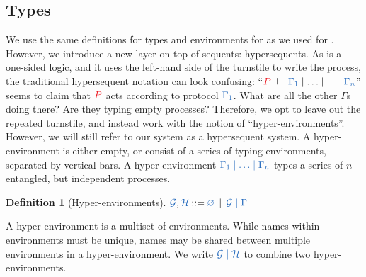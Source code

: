 \documentclass[submission,copyright,creativecommons]{eptcs}
\def\Coloneqq{\mathbin{::=}}
\newtheorem{definition}[lemma]{Definition}
\begin{document}
\subsection{Types}\label{sec:hcp-types}
We use the same definitions for types and environments for \hcp as we used for \cp. However, we introduce a new layer on top of sequents: hypersequents. As \cp is a one-sided logic, and it uses the left-hand side of the turnstile to write the process, the traditional hypersequent notation can look confusing: ``$\seq[P]{\Gamma_1}\hsep\dots\hsep\seq{\Gamma_n}$'' seems to claim that $\tm{P}$ acts according to protocol $\ty{\Gamma_1}$. What are all the other $\Gamma$s doing there? Are they typing empty processes? Therefore, we opt to leave out the repeated turnstile, and instead work with the notion of ``hyper-environments''. However, we will still refer to our system as a hypersequent system. A hyper-environment is either empty, or consist of a series of typing environments, separated by vertical bars. A hyper-environment $\ty{\Gamma_1 \hsep \dots \hsep \Gamma_n}$ types a series of $n$ entangled, but independent processes.
\begin{definition}[Hyper-environments]\label{def:hcp-hyper-environment}
  $\ty{\mathcal{G}}, \ty{\mathcal{H}} \Coloneqq \ty{\emptyhypercontext} \, \mid \, \ty{\mathcal{G} \hsep \Gamma}$
\end{definition}\noindent
A hyper-environment is a multiset of environments. While names within environments must be unique, names may be shared between multiple environments in a hyper-environment. We write $\ty{\mathcal{G} \hsep \mathcal{H}}$ to combine two hyper-environments.
\end{document}
